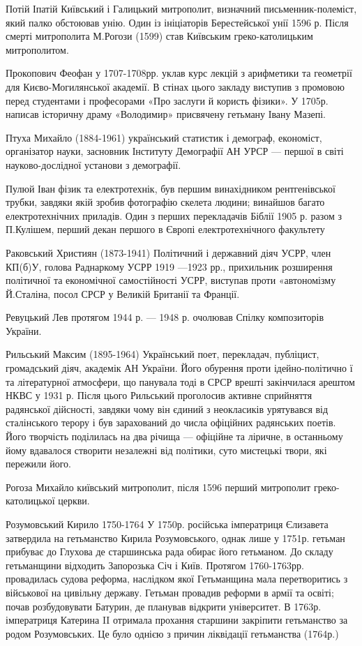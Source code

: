 Потій Іпатій  Київський і Галицький митрополит, визначний письменник-полеміст, який палко обстоював унію. Один із ініціаторів Берестейської унії 1596 р. Після смерті митрополита М.Рогози (1599) став Київським греко-католицьким митрополитом.

Прокопович Феофан  у 1707-1708рр. уклав курс лекцій з арифметики та геометрії для Києво-Могилянської академії. В стінах цього закладу виступив з промовою перед студентами і професорами «Про заслуги й користь фізики». У 1705р. написав історичну драму «Володимир» присвячену гетьману Івану Мазепі.

Птуха Михайло (1884-1961) український статистик і демограф, економіст, організатор науки, засновник Інституту Демографії АН УРСР --- першої в світі науково-дослідної установи з демографії.

Пулюй Іван фізик та електротехнік, був першим винахідником рентгенівської трубки, завдяки якій зробив фотографію скелета людини; винайшов багато електротехнічних при­ладів. Один з перших перекладачів Біблії 1905 р. разом з П.Кулішем, перший декан першого в Європі електротехнічного факультету 

Раковський Християн (1873-1941) Політичний і державний діяч УСРР, член КП(б)У, голова Раднаркому УСРР 1919 —1923 рр., прихильник розширення політичної та економічної самостійності УСРР, виступав проти «автономізму Й.Сталіна, посол СРСР у Великій Британії та Франції.

Ревуцький Лев протягом 1944 р. --- 1948 р. очолював Спілку композиторів України. 

Рильський Максим (1895-1964) Український поет, перекладач, публіцист, громадський діяч, академік АН України. Його обурення проти ідейно-політично ї та літературної атмосфери, що панувала тоді в СРСР врешті закінчилася арештом НКВС у 1931 р. Після цього Рильський проголосив активне сприйняття радянської дійсності, завдяки чому він єдиний з неокласиків урятувався від сталінського терору і був зарахований до числа офіційних радянських поетів. Його творчість поділилась на два річища --- офіційне та ліричне, в останньому йому вдавалося створити незалежні від політики, суто мистецькі твори, які пережили його.

Рогоза Михайло  київський митрополит, після 1596 перший митрополит греко-католицької церкви.

Розумовський Кирило  1750-1764 У 1750р. російська імператриця Єлизавета затвердила на гетьманство Кирила Розумовського, однак лише у 1751р. гетьман прибуває до Глухова де старшинська рада обирає його гетьманом. До складу гетьманщини відходить Запорозька Січ і Київ. Протягом 1760-1763рр. провадилась судова реформа, наслідком якої Гетьманщина мала перетворитись з військової на цивільну державу. Гетьман провадив реформи в армії та освіті; почав розбудовувати Батурин, де планував відкрити університет. В 1763р. імператриця Катерина II отримала прохання старшини закріпити гетьманство за родом Розумовських. Це було однією з причин ліквідації гетьманства (1764р.)


